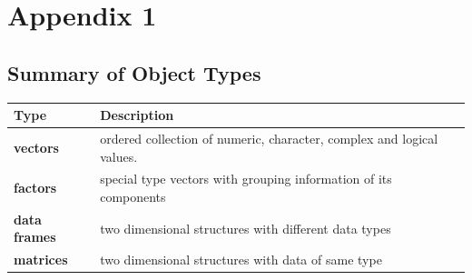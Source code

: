 \documentclass[a4paper]{book}
\begin{document}
\chapter*{Appendix 1}\label{appendix-1}

\section*{Summary of Object Types}\label{summary-of-object-types}

\begin{longtable}[]{@{}ll@{}}
\toprule
\begin{minipage}[b]{0.09\columnwidth}\raggedright\strut
Type\strut
\end{minipage} & \begin{minipage}[b]{0.72\columnwidth}\raggedright\strut
Description\strut
\end{minipage}\tabularnewline
\midrule
\endhead
\begin{minipage}[t]{0.09\columnwidth}\raggedright\strut
\textbf{vectors}\strut
\end{minipage} & \begin{minipage}[t]{0.72\columnwidth}\raggedright\strut
ordered collection of numeric, character, complex and logical
values.\strut
\end{minipage}\tabularnewline
\begin{minipage}[t]{0.09\columnwidth}\raggedright\strut
\textbf{factors}\strut
\end{minipage} & \begin{minipage}[t]{0.72\columnwidth}\raggedright\strut
special type vectors with grouping information of its components\strut
\end{minipage}\tabularnewline
\begin{minipage}[t]{0.09\columnwidth}\raggedright\strut
\textbf{data frames}\strut
\end{minipage} & \begin{minipage}[t]{0.72\columnwidth}\raggedright\strut
two dimensional structures with different data types\strut
\end{minipage}\tabularnewline
\begin{minipage}[t]{0.09\columnwidth}\raggedright\strut
\textbf{matrices}\strut
\end{minipage} & \begin{minipage}[t]{0.72\columnwidth}\raggedright\strut
two dimensional structures with data of same type\strut

\end{minipage}
\end{longtable}
\end{document}
